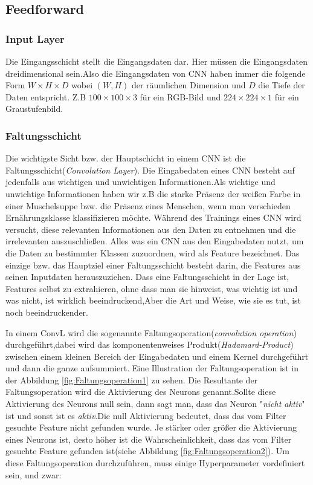 \documentclass[12pt,a4paper]{scrartcl}
\makeatletter
\numberwithin{equation}{section}
\renewcommand\paragraph{\@startsection{paragraph}{4}{\z@}%
	{-2.5ex\@plus -1ex \@minus -.25ex}%
	{1.25ex \@plus .25ex}%
	{\normalfont\normalsize\bfseries}}
\makeatother
\begin{document}
\subsection{Feedforward }
\subsubsection{Input Layer}\label{InputLayer}
Die Eingangsschicht stellt die Eingangsdaten dar. Hier müssen die Eingangsdaten dreidimensional sein.Also die Eingangsdaten von \ac{CNN}  haben immer die folgende Form $ W\times H\times D $ wobei $ (W, H) $ der räumlichen Dimension und $ D $ die Tiefe der Daten entspricht. Z.B  $ 100\times100 \times3 $ für ein RGB-Bild und $ 224\times224\times1 $ für ein Graustufenbild.


\subsubsection{Faltungsschicht}\label{ConvL}
Die wichtigste Sicht bzw. der Hauptschicht in einem \ac{CNN} ist die Faltungsschicht(\emph{Convolution Layer}).
Die Eingabedaten eines \ac{CNN} besteht auf jedenfalls aus wichtigen und unwichtigen Informationen.Als wichtige und unwichtige Informationen haben wir z.B die starke Präsenz der weißen Farbe in einer Muschelsuppe bzw. die Präsenz eines Menschen, wenn man verschieden Ernährungsklasse klassifizieren möchte. Während des Trainings eines \ac{CNN} wird versucht, diese relevanten Informationen aus den Daten zu entnehmen und die irrelevanten auszuschließen. Alles was ein \ac{CNN} aus den Eingabedaten nutzt, um die Daten zu bestimmter Klassen zuzuordnen, wird als Feature bezeichnet.
Das einzige bzw. das Hauptziel einer Faltungsschicht besteht darin, die Features aus seinen Inputdaten herauszuziehen.
Dass eine Faltungsschicht in der Lage ist, Features selbst zu extrahieren, ohne dass man sie hinweist, was wichtig ist und was nicht, ist wirklich beeindruckend,Aber die Art und Weise, wie sie es tut, ist noch beeindruckender.

In einem \ac{ConvL} wird die sogenannte Faltungsoperation(\emph{convolution operation}) durchgeführt,dabei wird das komponentenweises Produkt(\textit{Hadamard-Product}) zwischen einem kleinen Bereich der Eingabedaten und einem Kernel durchgeführt und dann die ganze aufsummiert. Eine Illustration der Faltungsoperation ist in der Abbildung \ref{fig:Faltungsoperation1} zu sehen. Die Resultante der Faltungsoperation wird die Aktivierung des Neurons genannt.Sollte diese Aktivierung des Neurons null sein, dann sagt man, dass das Neuron "\textit{nicht aktiv}"{} ist und sonst ist es \textit{aktiv}.Die null Aktivierung bedeutet, dass das vom Filter gesuchte Feature nicht gefunden wurde. Je stärker oder größer die Aktivierung eines Neurons ist, desto höher ist die Wahrscheinlichkeit, dass das vom Filter gesuchte Feature gefunden ist(siehe Abbildung \ref{fig:Faltungsoperation2}).
Um diese Faltungsoperation durchzuführen, muss einige Hyperparameter vordefiniert sein, und zwar:
\end{document}
